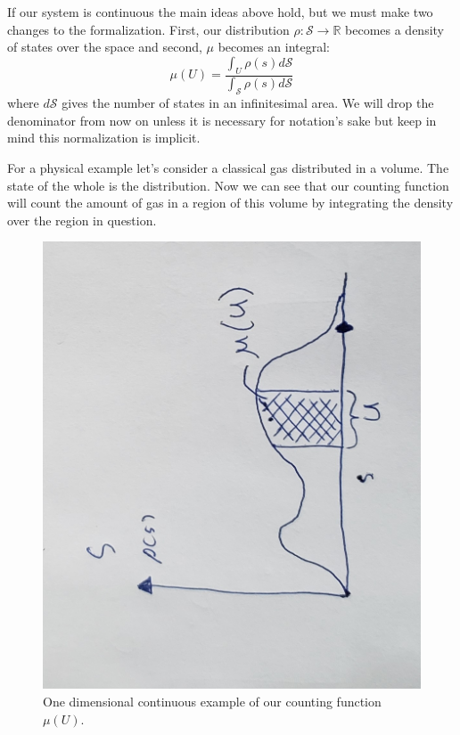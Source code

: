 \documentclass{article}
\begin{document}
	
	If our system is continuous the main ideas above hold, but we must make two changes to the formalization. First, our distribution $\rho : \mathcal{S} \to \mathbb{R}$ becomes a density of states over the space and second, $\mu$ becomes an integral: $$\mu(U) = \frac{\int_{U} \rho(s) d\mathcal{S}}{\int_{\mathcal{S}} \rho(s) d\mathcal{S}}$$ where $d\mathcal{S}$ gives the number of states in an infinitesimal area. We will drop the denominator from now on unless it is necessary for notation's sake but keep in mind this normalization is implicit.
	
	 For a physical example let's consider a classical gas distributed in a volume. The state of the whole is the distribution. Now we can see that our counting function will count the amount of gas in a region of this volume by integrating the density over the region in question.
	
\begin{figure}[!ht]
\centerline{\includegraphics[width=\textwidth,angle=-90,scale=.45]{diagram4.jpg}}
\caption{One dimensional continuous example of our counting function $\mu(U)$.}
\end{figure}
	
\end{document}
